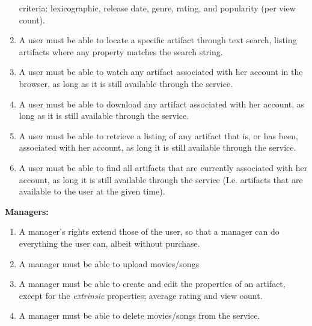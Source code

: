 \begin{enumerate}
	criteria: lexicographic, release date, genre, rating, and
	popularity (per view count).
\item A user must be able to locate a specific artifact through text search,
	listing artifacts where any property matches the search string.
\item A user must be able to watch any artifact associated with her account
	in the browser, as long as it is still available through the service.
\item A user must be able to download any artifact associated with her account,
	as long as it is still available through the service.
\item A user must be able to retrieve a listing of any artifact that is, or has
	been, associated with her account, as long it is still available through
	the service.
\item A user must be able to find all artifacts that are currently associated
	with her account, as long it is still available through the service (I.e.
	artifacts that are available to the user at the given time).
\setcounter{enumTemp}{\theenumi}
\end{enumerate}
\textbf{Managers:}
\begin{enumerate}
\setcounter{enumi}{\theenumTemp}
\item A manager's rights extend those of the user, so that a manager can do
	everything the user can, albeit without purchase.
\item A manager must be able to upload movies/songs
\item A manager must be able to create and edit the properties of an artifact,
	except for the \emph{extrinsic} properties; average rating and view
	count.
\item A manager must be able to delete movies/songs from the service.
\end{enumerate}

